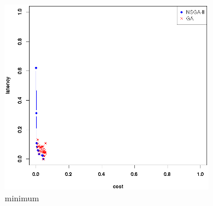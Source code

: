 \documentclass{llncs}
\begin{document}
\begin{figure}[H]
\begin{subfigure}[b]{0.3\textwidth}
		\includegraphics[width=\textwidth]{pics/pop_50_gen_50_5_times_5_minimum.png}
		\caption{minimum}
	\end{subfigure}

	\caption{}\label{fig:condition}
\end{figure}
\end{document}
